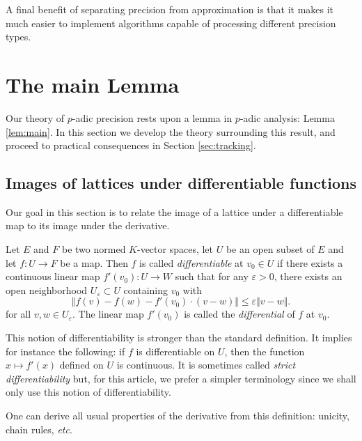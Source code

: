 \documentclass{lms}
\begin{document}
A final benefit of separating precision from approximation is that it makes
it much easier to implement algorithms capable of processing different precision types.

\section{The main Lemma}
\label{sec:mainlemma}

Our theory of $p$-adic precision rests upon a lemma in $p$-adic 
analysis: Lemma \ref{lem:main}.  In this section we develop the theory 
surrounding this result, and proceed to practical consequences in 
Section \ref{sec:tracking}.

\subsection{Images of lattices under differentiable functions}

Our goal in this section is to relate the image of a lattice under a 
differentiable map to its image under the derivative.

\begin{deftn} \label{deftn : diff}
Let $E$ and $F$ be two normed $K$-vector spaces, let $U$ be an open 
subset of $E$ and let $f : U \rightarrow F$ be a map. Then $f$ is called 
\emph{differentiable} at $v_0 \in U$ if there exists a continuous linear 
map $f'(v_0) : U \rightarrow W$ such that for any $\varepsilon >0$, 
there exists an open neighborhood $U_\varepsilon \subset U$ containing 
$v_0$ with
\[ 
\Vert f(v)-f(w)-f'(v_0) \cdot \left( v-w \right) \Vert 
\leq \varepsilon \Vert v-w \Vert. 
\]
for all $v, w \in U_\varepsilon$.  The linear map $f'(v_0)$ is called the \emph{differential} of $f$ at $v_0$.
\end{deftn}

\begin{rem}
\label{rem:differentiability}
This notion of differentiability is stronger than the standard definition.
It implies for instance the following: if $f$ is 
differentiable on $U$, then the function $x \mapsto f'(x)$ defined on 
$U$ is continuous. 
It is sometimes called \emph{strict differentiability} but, for this
article, we prefer a simpler terminology since we shall only use this
notion of differentiability.
\end{rem}

One can derive all usual properties of the derivative from this 
definition: unicity, chain rules, \emph{etc}.
\end{document}
